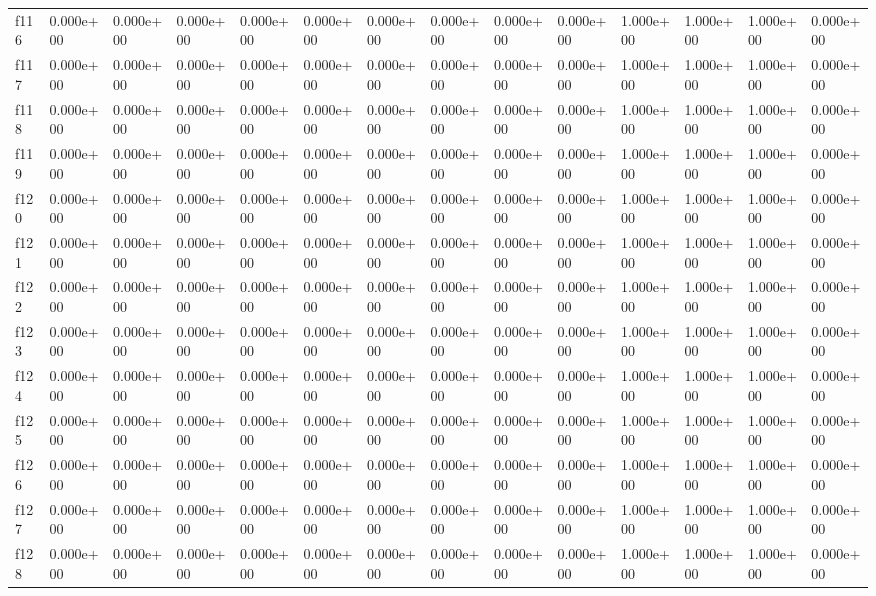 \begin{table}
\begin{tabular}{llllllllllllll}
f116 & 0.000e+00 & 0.000e+00 & 0.000e+00 & 0.000e+00 & 0.000e+00 & 0.000e+00 & 0.000e+00 & 0.000e+00 & 0.000e+00 & 1.000e+00 & 1.000e+00 & 1.000e+00 & 0.000e+00 \\
f117 & 0.000e+00 & 0.000e+00 & 0.000e+00 & 0.000e+00 & 0.000e+00 & 0.000e+00 & 0.000e+00 & 0.000e+00 & 0.000e+00 & 1.000e+00 & 1.000e+00 & 1.000e+00 & 0.000e+00 \\
f118 & 0.000e+00 & 0.000e+00 & 0.000e+00 & 0.000e+00 & 0.000e+00 & 0.000e+00 & 0.000e+00 & 0.000e+00 & 0.000e+00 & 1.000e+00 & 1.000e+00 & 1.000e+00 & 0.000e+00 \\
f119 & 0.000e+00 & 0.000e+00 & 0.000e+00 & 0.000e+00 & 0.000e+00 & 0.000e+00 & 0.000e+00 & 0.000e+00 & 0.000e+00 & 1.000e+00 & 1.000e+00 & 1.000e+00 & 0.000e+00 \\
f120 & 0.000e+00 & 0.000e+00 & 0.000e+00 & 0.000e+00 & 0.000e+00 & 0.000e+00 & 0.000e+00 & 0.000e+00 & 0.000e+00 & 1.000e+00 & 1.000e+00 & 1.000e+00 & 0.000e+00 \\
f121 & 0.000e+00 & 0.000e+00 & 0.000e+00 & 0.000e+00 & 0.000e+00 & 0.000e+00 & 0.000e+00 & 0.000e+00 & 0.000e+00 & 1.000e+00 & 1.000e+00 & 1.000e+00 & 0.000e+00 \\
f122 & 0.000e+00 & 0.000e+00 & 0.000e+00 & 0.000e+00 & 0.000e+00 & 0.000e+00 & 0.000e+00 & 0.000e+00 & 0.000e+00 & 1.000e+00 & 1.000e+00 & 1.000e+00 & 0.000e+00 \\
f123 & 0.000e+00 & 0.000e+00 & 0.000e+00 & 0.000e+00 & 0.000e+00 & 0.000e+00 & 0.000e+00 & 0.000e+00 & 0.000e+00 & 1.000e+00 & 1.000e+00 & 1.000e+00 & 0.000e+00 \\
f124 & 0.000e+00 & 0.000e+00 & 0.000e+00 & 0.000e+00 & 0.000e+00 & 0.000e+00 & 0.000e+00 & 0.000e+00 & 0.000e+00 & 1.000e+00 & 1.000e+00 & 1.000e+00 & 0.000e+00 \\
f125 & 0.000e+00 & 0.000e+00 & 0.000e+00 & 0.000e+00 & 0.000e+00 & 0.000e+00 & 0.000e+00 & 0.000e+00 & 0.000e+00 & 1.000e+00 & 1.000e+00 & 1.000e+00 & 0.000e+00 \\
f126 & 0.000e+00 & 0.000e+00 & 0.000e+00 & 0.000e+00 & 0.000e+00 & 0.000e+00 & 0.000e+00 & 0.000e+00 & 0.000e+00 & 1.000e+00 & 1.000e+00 & 1.000e+00 & 0.000e+00 \\
f127 & 0.000e+00 & 0.000e+00 & 0.000e+00 & 0.000e+00 & 0.000e+00 & 0.000e+00 & 0.000e+00 & 0.000e+00 & 0.000e+00 & 1.000e+00 & 1.000e+00 & 1.000e+00 & 0.000e+00 \\
f128 & 0.000e+00 & 0.000e+00 & 0.000e+00 & 0.000e+00 & 0.000e+00 & 0.000e+00 & 0.000e+00 & 0.000e+00 & 0.000e+00 & 1.000e+00 & 1.000e+00 & 1.000e+00 & 0.000e+00 \\

\end{tabular}
\end{table}
